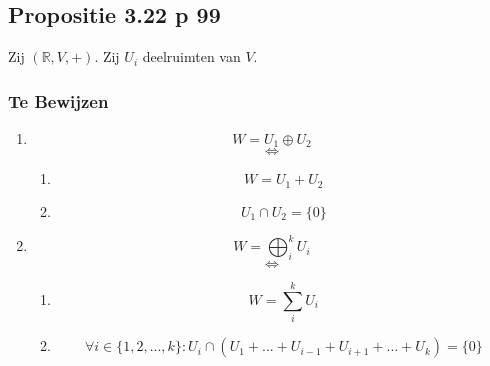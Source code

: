\documentclass[lineaire_algebra_oplossingen.tex]{subfiles}
\begin{document}
\subsection{Propositie 3.22 p 99}
Zij $(\mathbb{R},V,+)$. Zij $U_i$ deelruimten van $V$.
\subsubsection*{Te Bewijzen}
\begin{enumerate}
\item
\[
W = U_1 \oplus U_2
\]
\[\Leftrightarrow\]
\begin{enumerate}
\item
\[
W = U_1 + U_2
\]
\item
\[
U_1\cap U_2 = \{0\}
\]
\end{enumerate}
\item
\[
W = \bigoplus_{i}^kU_i
\]
\[\Leftrightarrow\]
\begin{enumerate}
\item
\[
W = \sum_i^k U_i
\]
\item
\[
\forall i \in \{1,2,...,k\}: U_i \cap (U_1+...+U_{i-1}+U_{i+1}+...+U_k)=\{0\}
\]
\end{enumerate}
\end{enumerate}
\end{document}

